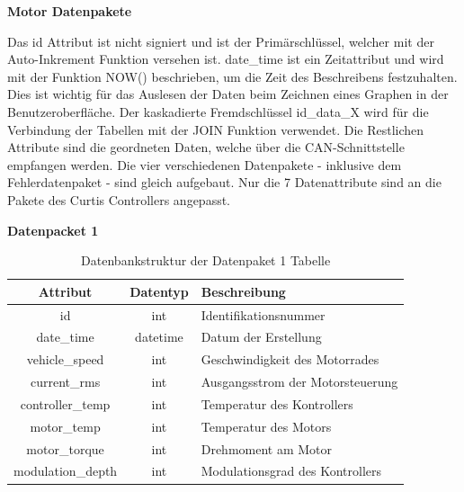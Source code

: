 \newpage

{\large \textbf{Motor Datenpakete}}

Das id Attribut ist nicht signiert und ist der Primärschlüssel, welcher mit der Auto-Inkrement Funktion versehen ist. date\_time ist ein Zeitattribut und wird mit der Funktion NOW() beschrieben, um die Zeit des Beschreibens festzuhalten. Dies ist wichtig für das Auslesen der Daten beim Zeichnen eines Graphen in der Benutzeroberfläche. Der kaskadierte Fremdschlüssel
id\_data\_X wird für die Verbindung der Tabellen mit der JOIN Funktion verwendet. Die Restlichen Attribute sind die geordneten Daten, welche über die CAN-Schnittstelle empfangen werden. Die vier verschiedenen Datenpakete - inklusive dem Fehlerdatenpaket - sind gleich aufgebaut. Nur die 7 Datenattribute sind an die Pakete des Curtis Controllers angepasst. 

\begin{center}
	\textbf{Datenpacket 1}
\end{center}
 
\begin{table}[H]
	\begin{center}
		\begin{tabular}{|c|c|l|}
			\hline
			\textbf{Attribut} & \textbf{Datentyp} & \textbf{Beschreibung}            \\ \hline
			id                & int               & Identifikationsnummer            \\ \hline
			date\_time        & datetime          & Datum der Erstellung             \\ \hline
			vehicle\_speed    & int               & Geschwindigkeit des Motorrades   \\ \hline
			current\_rms      & int               & Ausgangsstrom der Motorsteuerung \\ \hline
			controller\_temp  & int               & Temperatur des Kontrollers       \\ \hline
			motor\_temp       & int               & Temperatur des Motors            \\ \hline
			motor\_torque     & int               & Drehmoment am Motor              \\ \hline
			modulation\_depth & int               & Modulationsgrad des Kontrollers  \\ \hline
		\end{tabular}
			\caption{Datenbankstruktur der Datenpaket 1 Tabelle}
			\label{tab:data1}
	\end{center}
\end{table}


